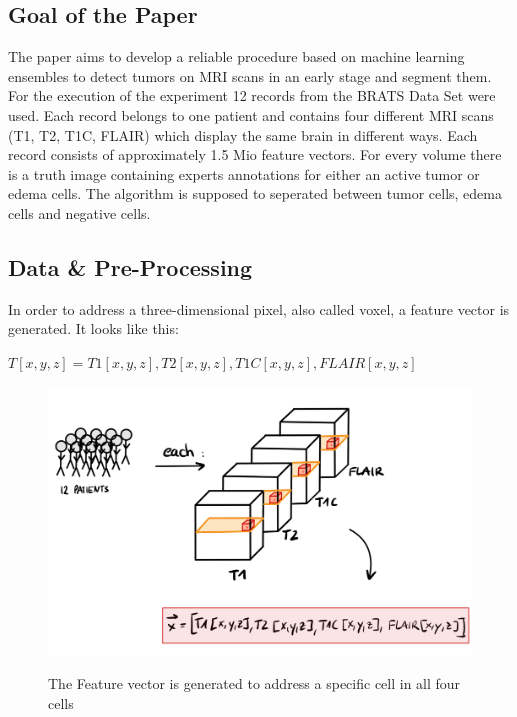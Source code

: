 \documentclass[
12pt,
headsepline,
bibliography=totoc,
twoside=semi,
fleqn
]{scrartcl}
\begin{document}
  \subsection{Goal of the Paper\label{sec:sec3-1}}
    The paper aims to develop a reliable procedure based on machine learning ensembles to detect tumors on MRI scans in an early stage and segment them. For the execution of the experiment 12 records from the BRATS Data Set were used. Each record belongs to one patient and contains four different MRI scans (T1, T2, T1C, FLAIR) which display the same brain in different ways. Each record consists of approximately 1.5 Mio feature vectors. For every volume there is a truth image containing experts annotations for either an active tumor or edema cells.  The algorithm is supposed to seperated between tumor cells, edema cells and negative cells.

  \subsection{Data \& Pre-Processing\label{sec:sec3-2}}
    In order to address a three-dimensional pixel, also called voxel, a feature vector is generated. It looks like this:\\
     
    \begin{center} $T[x,y,z] = T1[x,y,z], T2[x,y,z], T1C[x,y,z], FLAIR[x,y,z]$\end{center}

    \begin{figure}[H]
      \centering \includegraphics[scale=0.7]{BDT14.png}\label{fig:fig14}
      \caption{The Feature vector is generated to address a specific cell in all four cells}
    \end{figure}
\end{document}
